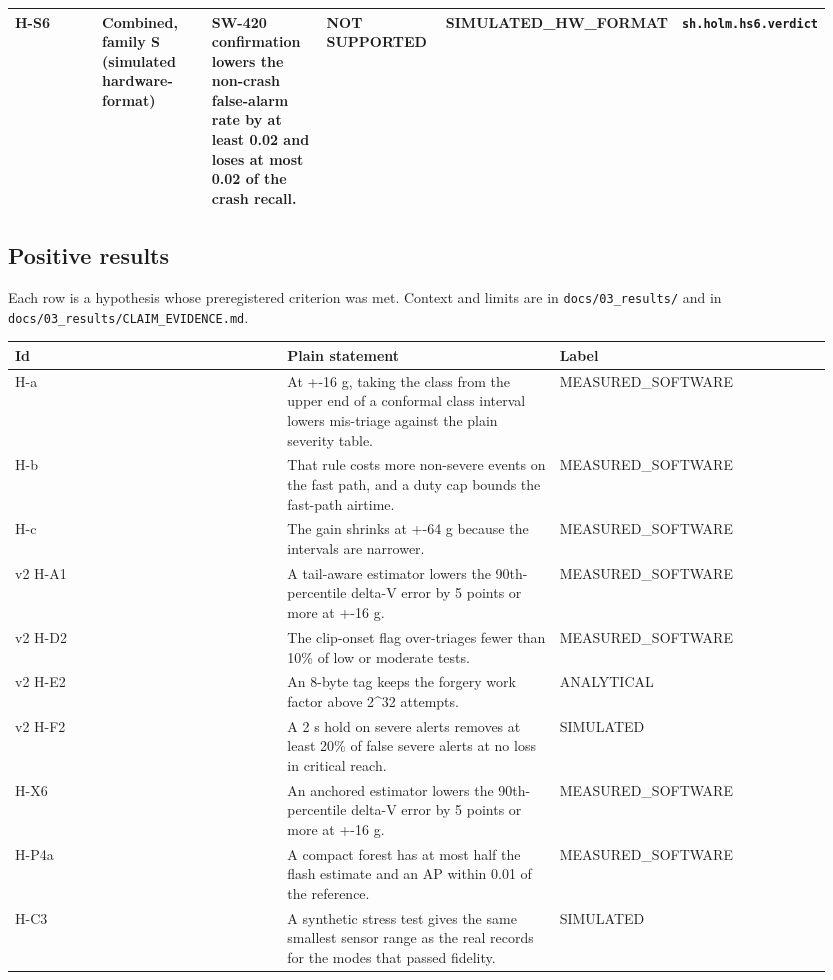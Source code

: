 {\begin{longtable}{p{0.158\linewidth}p{0.158\linewidth}p{0.158\linewidth}p{0.158\linewidth}p{0.158\linewidth}p{0.158\linewidth}}
H-S6 & Combined, family S (simulated hardware-format) & SW-420 confirmation lowers the non-crash false-alarm rate by at least 0.02 and loses at most 0.02 of the crash recall. & NOT SUPPORTED & SIMULATED\_HW\_FORMAT & \texttt{sh.holm.hs6.verdict} \\
\bottomrule
\end{longtable}}

\subsection*{Positive results}

Each row is a hypothesis whose preregistered criterion was met. Context and limits are in \texttt{docs/03\_results/} and in \texttt{docs/03\_results/CLAIM\_EVIDENCE.md}.

{\scriptsize\raggedright
\begin{longtable}{p{0.317\linewidth}p{0.317\linewidth}p{0.317\linewidth}}
\toprule
Id & Plain statement & Label \\
\midrule
\endhead
H-a & At +-16 g, taking the class from the upper end of a conformal class interval lowers mis-triage against the plain severity table. & MEASURED\_SOFTWARE \\
H-b & That rule costs more non-severe events on the fast path, and a duty cap bounds the fast-path airtime. & MEASURED\_SOFTWARE \\
H-c & The gain shrinks at +-64 g because the intervals are narrower. & MEASURED\_SOFTWARE \\
v2 H-A1 & A tail-aware estimator lowers the 90th-percentile delta-V error by 5 points or more at +-16 g. & MEASURED\_SOFTWARE \\
v2 H-D2 & The clip-onset flag over-triages fewer than 10\% of low or moderate tests. & MEASURED\_SOFTWARE \\
v2 H-E2 & An 8-byte tag keeps the forgery work factor above 2\textasciicircum{}32 attempts. & ANALYTICAL \\
v2 H-F2 & A 2 s hold on severe alerts removes at least 20\% of false severe alerts at no loss in critical reach. & SIMULATED \\
H-X6 & An anchored estimator lowers the 90th-percentile delta-V error by 5 points or more at +-16 g. & MEASURED\_SOFTWARE \\
H-P4a & A compact forest has at most half the flash estimate and an AP within 0.01 of the reference. & MEASURED\_SOFTWARE \\
H-C3 & A synthetic stress test gives the same smallest sensor range as the real records for the modes that passed fidelity. & SIMULATED \\

\end{longtable}}
